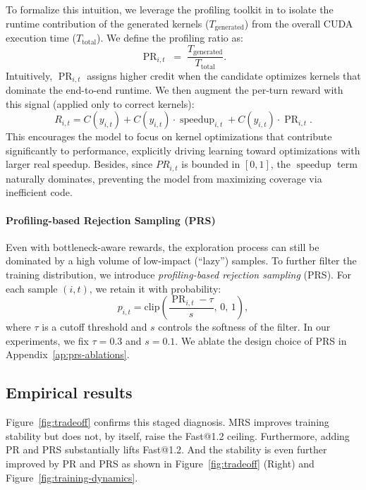 To formalize this intuition, we leverage the profiling toolkit in \env{} to isolate the runtime contribution of the generated kernels ($T_{\text{generated}}$) from the overall CUDA execution time ($T_{\text{total}}$). We define the profiling ratio as:
\begin{equation}
\operatorname{PR}_{i,t} \;=\; \frac{T_{\text{generated}}}{T_{\text{total}}}.
\end{equation}
Intuitively, $\operatorname{PR}_{i,t}$ assigns higher credit when the candidate optimizes kernels that dominate the end-to-end runtime. We then augment the per-turn reward with this signal (applied only to correct kernels):
\begin{equation} 
\label{eq:pr}
R_{i,t} = C(y_{i,t}) + C(y_{i,t})\cdot \operatorname{speedup}_{i,t} + C(y_{i,t})\cdot \operatorname{PR}_{i,t}.
\end{equation}
This encourages the model to focus on kernel optimizations that contribute significantly to performance, explicitly driving learning toward optimizations with larger real speedup. Besides, since $PR_{i,t}$ is bounded in $[0,1]$, the $\operatorname{speedup}$ term naturally dominates, preventing the model from maximizing coverage via inefficient code.

\paragraph{Profiling-based Rejection Sampling (PRS)}
Even with bottleneck-aware rewards, the exploration process can still be dominated by a high volume of low-impact (``lazy'') samples. To further filter the training distribution, we introduce \emph{profiling-based rejection sampling} (PRS). For each sample $(i,t)$, we retain it with probability:
\begin{equation}
p_{i,t}
=\mathrm{clip}\!\left(\frac{\operatorname{PR}_{i,t}-\tau}{s},\,0,\,1\right),
\label{eq:prs}
\end{equation}
where $\tau$ is a cutoff threshold and $s$ controls the softness of the filter. In our experiments, we fix $\tau=0.3$ and $s=0.1$. We ablate the design choice of PRS in Appendix~\ref{ap:prs-ablations}.

\subsection{Empirical results}
Figure~\ref{fig:tradeoff} confirms this staged diagnosis. MRS improves training stability but does not, by itself, raise the Fast@1.2 ceiling. Furthermore, adding PR and PRS substantially lifts Fast@1.2. And the stability is even further improved by PR and PRS as shown in Figure~\ref{fig:tradeoff} (Right) and Figure~\ref{fig:training-dynamics}.